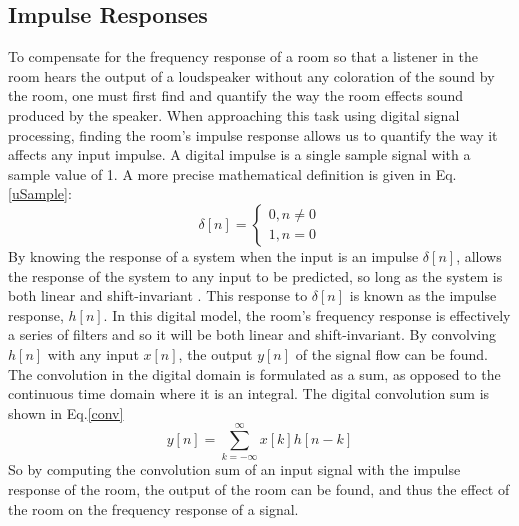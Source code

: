 \documentclass[conference]{IEEEtran}
\begin{document}
    \subsection{Impulse Responses}
        To compensate for the frequency response of a room so that a listener in the room hears the output of a loudspeaker without any coloration of the sound by the room, one must first find and quantify the way the room effects sound produced by the speaker.
        When approaching this task using digital signal processing, finding the room's impulse response allows us to quantify the way it affects any input impulse.
        A digital impulse is a single sample signal with a sample value of 1.
        A more precise mathematical definition is given in Eq.\ref{uSample}:
        \begin{equation}\label{uSample}
            \delta[n] = 
            \begin{cases}
                0, n \neq 0\\
                1, n = 0
            \end{cases}
        \end{equation}
        By knowing the response of a system when the input is an impulse $\delta[n]$, allows the response of the system to any input to be predicted, so long as the system is both linear and shift-invariant \cite{OPPENHEIM}.
        This response to $\delta[n]$ is known as the impulse response, $h[n]$.
        In this digital model, the room's frequency response is effectively a series of filters and so it will be both linear and shift-invariant.
        By convolving $h[n]$ with any input $x[n]$, the output $y[n]$ of the signal flow can be found. 
        The convolution in the digital domain is formulated as a sum, as opposed to the continuous time domain where it is an integral.
        The digital convolution sum is shown in Eq.\ref{conv}
        \newpage
        \begin{equation}\label{conv}
            y[n] = \sum_{k=-\infty}^\infty x[k] h[n-k]
        \end{equation}
        So by computing the convolution sum of an input signal with the impulse response of the room, the output of the room can be found, and thus the effect of the room on the frequency response of a signal.
\end{document}
